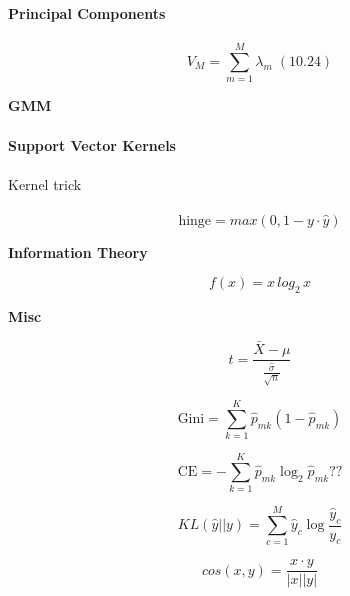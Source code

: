 \documentclass[fleqn]{article}
\begin{document}
\begin{minipage}[t]{.33333\textwidth}


\textbf{Principal Components}
\\\\

\begin{equation*}
	V_M = \sum_{m=1}^{M}\lambda_m \; (10.24)
\end{equation*}

\textbf{GMM}
\\\\
\textbf{Support Vector Kernels}
\\\\
Kernel trick
\\\\

\begin{equation*}
\text{hinge} = max(0, 1 - y \cdot \hat{y})
\end{equation*}

\textbf{Information Theory}


\begin{equation*}
	f(x) = x\,log_2\,x
\end{equation*}

\textbf{Misc}

\begin{equation*}
	t = \frac{\bar{X} - \mu}{\frac{\hat{\sigma}}{\sqrt{n}}}
\end{equation*}


\begin{equation*}
	\text{Gini} = \sum_{k=1}^{K}\hat{p}_{mk}(1-\hat{p}_{mk})
\end{equation*}

\begin{equation*}
	\text{CE} = -\sum_{k=1}^{K}\hat{p}_{mk}\log _2 \hat{p}_{mk} ??
\end{equation*}

%

\begin{equation*}
KL(\hat{y} || y) = \sum_{c=1}^{M}\hat{y}_c \log{\frac{\hat{y}_c}{y_c}}
\end{equation*}

\begin{equation*}
cos(x,y) = \frac{x \cdot y}{|x||y|}
\end{equation*}

\end{minipage}
\end{document}
